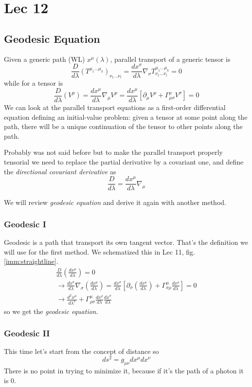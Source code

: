 \section{Lec 12}
\subsection{Geodesic Equation}
Given a generic path (WL) $x^{\mu }\left( \lambda  \right)$, parallel transport of a generic tensor is
\[
\frac{D}{d\lambda } \left( T^{\mu _{1}\ldots \mu _{k}} \right)_{\nu _{1}\ldots \nu _{l}} =\frac{d x^{\sigma }}{d \lambda } \nabla _{\sigma } T^{\mu _{1}\ldots \mu _{k}}_{\nu _{1}\ldots \nu _{l}} = 0		
\]
while for a tensor is 
\[
	\frac{D}{d\lambda } \left( V^{\rho } \right) = \frac{d x^{\mu }}{d \lambda } \nabla _{\mu }V^{\rho } = \frac{d x^{\mu }}{d \lambda } \left[ \partial_{\mu }V^{\rho } + \Gamma ^{\rho }_{\mu \sigma  } V^{\sigma } \right]=0
\]
We can look at the parallel transport equations as a first-order differential equation defining an initial-value problem: given a tensor at some point along the path, there will be a unique continuation of the tensor to other points along the path.

Probably was not said before but to make the parallel transport properly tensorial we need to replace the partial derivative by a covariant one, and define the \emph{directional covariant derivative} as
\[
\frac{D}{d\lambda } = \frac{d x^{\mu }}{d \lambda }\nabla _{\mu }
\]

We will review \emph{geodesic equation} and derive it again with another method.

\subsubsection{Geodesic I}
Geodesic is a path that transport its own tangent vector. That's the definition we will use for the first method. We schematized this in Lec 11, fig. \ref{imm:straightline}.
\begin{gather*}
\frac{D}{d\lambda } \left( \frac{d x^{\mu }}{d \lambda } \right) = 0 \\
\to  \frac{d x^{\sigma }}{d \lambda }\nabla _{\sigma }\left( \frac{d x^{\mu }}{d \lambda } \right) = \frac{d x^{\sigma }}{d \lambda }\left[ \partial_{\sigma } \left( \frac{d x^{\mu }}{d \lambda } \right) + \Gamma ^{\mu }_{\sigma \rho } \frac{d x^{\rho }}{d \lambda } \right] = 0 \\
\to \frac{d ^{2} x^{\mu }}{d \lambda ^{2}} + \Gamma ^{\mu }_{\rho \sigma } \frac{d x^{\rho }}{d \lambda } \frac{d x^{\sigma }}{d \lambda } 
\end{gather*}
so we get the \emph{geodesic equation.}

\subsubsection{Geodesic II}

This time let's start from the concept of distance so
\[
ds^{2} = g_{\mu \nu } dx^{\mu }dx^{\nu }
\]
There is no point in trying to minimize it, because if it's the path of a photon it is 0.
